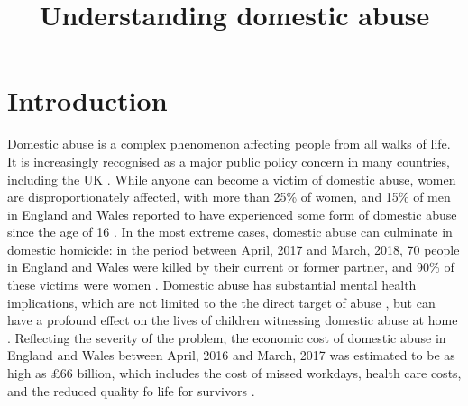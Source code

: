 \documentclass[11pt, a4paper]{article}
\begin{document}
\title{Understanding domestic abuse}
\date{}
\maketitle

\section{Introduction}

Domestic abuse is a complex phenomenon affecting people from all walks of life. It is increasingly recognised as a major public policy concern in many countries, including the UK \cite{ep}. While anyone can become a victim of domestic abuse, women are disproportionately affected, with more than 25\% of women, and 15\% of men in England and Wales reported to have experienced some form of domestic abuse since the age of 16 \cite{ONS}. In the most extreme cases, domestic abuse can culminate in domestic homicide: in the period between April, 2017 and March, 2018, 70 people in England and Wales were killed by their current or former partner, and 90\% of these victims were women \cite{homic}. Domestic abuse has substantial mental health implications, which are not limited to the the direct target of abuse \cite{ferrari}, but can have a profound effect on the lives of children witnessing domestic abuse at home \cite{callaghan}. Reflecting the severity of the problem, the economic cost of domestic abuse in England and Wales between April, 2016 and March, 2017 was estimated to be as high as \pounds 66 billion, which includes the cost of missed workdays, health care costs, and the reduced quality fo life for survivors \cite{costs}.



\end{document}
